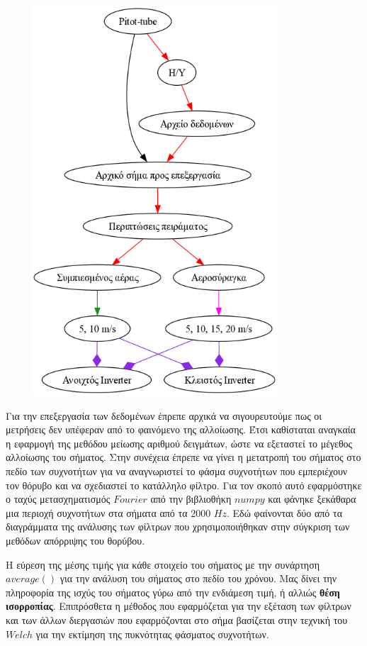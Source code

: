 \documentclass[breaklines=true, 12pt]{article}
\begin{document}
\begin{center}
\includegraphics[width=420px,height=550px]{./flowcharts/test-first.png}
\end{center}

Για την επεξεργασία των δεδομένων έπρεπε αρχικά να σιγουρευτούμε πως οι
μετρήσεις δεν υπέφεραν από το φαινόμενο της αλλοίωσης. Έτσι καθίσταται
αναγκαία η εφαρμογή της μεθόδου μείωσης αριθμού δειγμάτων, ώστε να εξεταστεί
το μέγεθος αλλοίωσης του σήματος. Στην συνέχεια έπρεπε να γίνει η μετατροπή
του σήματος στο πεδίο των συχνοτήτων για να αναγνωριστεί το φάσμα συχνοτήτων
που εμπεριέχουν τον θόρυβο και να σχεδιαστεί το κατάλληλο φίλτρο. Για τον σκοπό
αυτό εφαρμόστηκε ο ταχύς μετασχηματισμός \(Fourier\) από την βιβλιοθήκη \(numpy\) και
φάνηκε ξεκάθαρα μια περιοχή συχνοτήτων στα σήματα από τα 2000 \(Hz\).
Εδώ φαίνονται δύο από τα διαγράμματα της ανάλυσης των φίλτρων που
χρησιμοποιήθηκαν στην σύγκριση των μεθόδων απόρριψης του θορύβου.

Η εύρεση της μέσης τιμής για κάθε στοιχείο του
σήματος με την συνάρτηση \(average()\) για την ανάλυση του σήματος στο πεδίο του
χρόνου. Μας δίνει την πληροφορία της ισχύς του σήματος γύρω από την ενδιάμεση
τιμή, ή αλλιώς \textbf{θέση ισορροπίας}. Επιπρόσθετα η μέθοδος που εφαρμόζεται για
την εξέταση των φίλτρων και των άλλων διεργασιών που εφαρμόζονται στο σήμα
βασίζεται στην τεχνική του \(Welch\) για την εκτίμηση της πυκνότητας φάσματος
συχνοτήτων.
\end{document}
